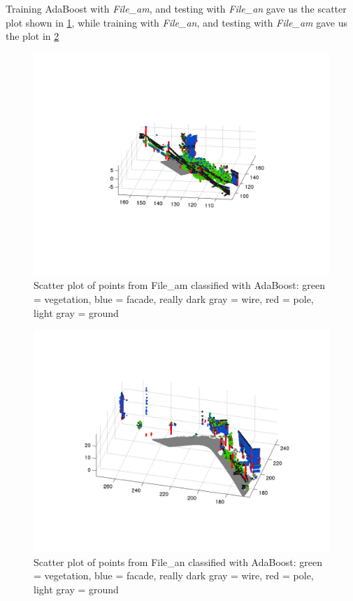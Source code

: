 \documentclass[letterpaper]{article}
\begin{document}
Training AdaBoost with \textit{File\_am}, and testing with \textit{File\_an} gave us the scatter plot shown in \ref{Fig_Ada1}, while training with \textit{File\_an}, and testing with \textit{File\_am} gave us the plot in \ref{Fig_Ada2}
\begin{figure}[t]
\includegraphics[width=.8\linewidth]{boost_trainam_testan.png}
\caption{Scatter plot of points from File\_am classified with AdaBoost: green = vegetation, blue = facade, really dark gray = wire, red = pole, light gray = ground}
\label{Fig_Ada1}
\end{figure}
\begin{figure}[t]
\includegraphics[width=.8\linewidth]{boost_trainan_testam.png}
\caption{Scatter plot of points from File\_an classified with AdaBoost: green = vegetation, blue = facade, really dark gray = wire, red = pole, light gray = ground}
\label{Fig_Ada2}
\end{figure}
\end{document}
